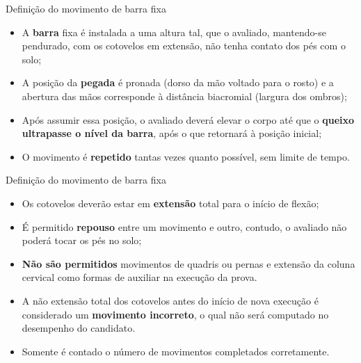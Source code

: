 
\begin{frame}{Definição do movimento de barra fixa}
    \begin{itemize}
        \item A \textbf{barra} fixa é instalada a uma altura tal, que o avaliado, mantendo-se pendurado, com os cotovelos em extensão, não tenha contato dos pés com o solo;
        \item  A posição da \textbf{pegada} é pronada (dorso da mão voltado para o rosto) e a abertura das mãos corresponde à distância biacromial (largura dos ombros); 
        \item  Após assumir essa posição, o avaliado deverá elevar o corpo até que o \textbf{queixo ultrapasse o nível da barra}, após o que retornará à posição inicial; 
        \item  O movimento é \textbf{repetido} tantas vezes quanto possível, sem limite de tempo. 
    \end{itemize}
\end{frame}

\begin{frame}{Definição do movimento de barra fixa}
    \begin{itemize}
        \item  Os cotovelos deverão estar em \textbf{extensão} total para o início de flexão; 
        \item  É permitido \textbf{repouso} entre um movimento e outro, contudo, o avaliado não poderá tocar os pés no solo; 
        \item  \textbf{Não são permitidos} movimentos de quadris ou pernas e extensão da coluna cervical como formas de auxiliar na execução da prova. 
        \item  A não extensão total dos cotovelos antes do início de nova execução é considerado um \textbf{movimento incorreto}, o qual não será computado no desempenho do candidato. 
        \item  Somente é contado o número de movimentos completados corretamente.
    \end{itemize}
\end{frame}


